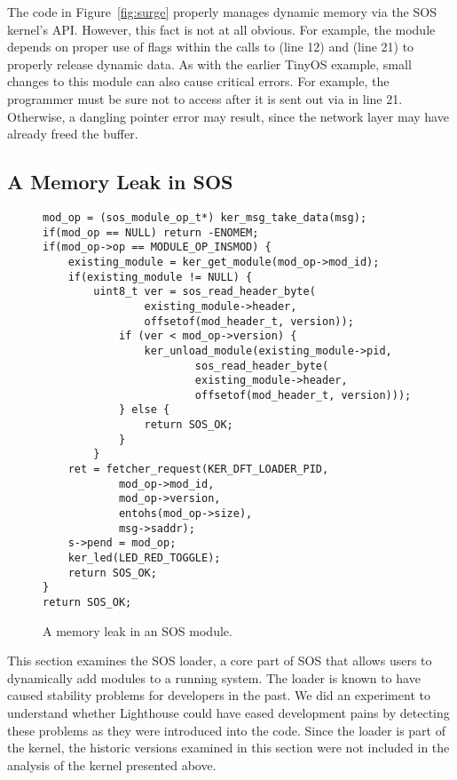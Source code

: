 The code in Figure~\ref{fig:surge} properly manages dynamic memory via the
SOS kernel's API.  
%
However, this fact is not at all obvious.  
%
For example, the module depends on proper use of flags within the calls to
 (line 12) and  (line 21) to properly
release dynamic data.
%
As with the earlier TinyOS example, small changes to this module can also
cause critical errors.  
%
For example, the programmer must be sure not to access  after
it is sent out via  in line 21.  
%
Otherwise, a dangling pointer error may result, since the network layer may
have already freed the buffer. 



\subsection{A Memory Leak in SOS}
\label{ss:tale}



\begin{figure}[tp]
\begin{scriptsize}
\begin{verbatim}
mod_op = (sos_module_op_t*) ker_msg_take_data(msg);
if(mod_op == NULL) return -ENOMEM;
if(mod_op->op == MODULE_OP_INSMOD) {
    existing_module = ker_get_module(mod_op->mod_id);
    if(existing_module != NULL) {
        uint8_t ver = sos_read_header_byte(
                existing_module->header,
                offsetof(mod_header_t, version));
            if (ver < mod_op->version) {
                ker_unload_module(existing_module->pid, 
                        sos_read_header_byte(
                        existing_module->header,
                        offsetof(mod_header_t, version)));
            } else {
                return SOS_OK;
            }
        }
    ret = fetcher_request(KER_DFT_LOADER_PID,
            mod_op->mod_id,
            mod_op->version,
            entohs(mod_op->size),
            msg->saddr);
    s->pend = mod_op;
    ker_led(LED_RED_TOGGLE);
    return SOS_OK;
}
return SOS_OK;
\end{verbatim}
\end{scriptsize}
\caption{\label{fig:leak}A memory leak in an SOS module.}
\end{figure}



This section examines the SOS loader, a core part of SOS that allows users
to dynamically add modules to a running system.  
%
The loader is known to have caused stability problems for developers in the
past.  We did an experiment to understand whether Lighthouse could have
eased development pains by detecting these problems as they were introduced
into the code.  
%
Since the loader is part of the kernel, the historic versions examined in
this section were not included in the analysis of the kernel presented
above.



